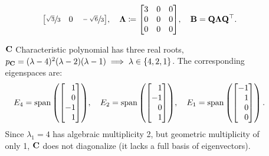 \documentclass[11pt]{article}
\begin{document}
\begin{enumerate}
\begin{enumerate}[align=left]
\[\begin{bmatrix*}[r]
                            \sfrac{\sqrt{3}}{3} & 0                    & \sfrac{-\sqrt{6}}{3} \\
                        \end{bmatrix*}
                        \!,
                        \quad
                        \mat{\Lambda} \coloneq
                        \begin{bmatrix}
                            3 & 0 & 0 \\
                            0 & 0 & 0 \\
                            0 & 0 & 0 \\
                        \end{bmatrix}
                        \!,
                        \quad
                        \mat{B} = \mat{Q} \mat{\Lambda} \mat{Q}^\top.
                    \]

              \item[$\mathbf{C}$] Characteristic polynomial has three real roots, $p_{\mathbf{C}} = (\lambda
                        - 4)^2(\lambda - 2)(\lambda - 1) \implies \lambda \in \left\{4, 2, 1\right\}$.  The
                    corresponding eigenspaces are:
                    \[
                        E_4 = \Span \args{
                            \begin{bmatrix*}[r]
                                1 \\ 0 \\ -1 \\ 1
                            \end{bmatrix*}
                        }
                        \! , \quad
                        E_2 = \Span \args{
                            \begin{bmatrix*}[r]
                                1 \\ -1 \\ 0 \\ 1
                            \end{bmatrix*}
                        }
                        \! , \quad
                        E_1 = \Span \args{
                            \begin{bmatrix*}[r]
                                -1 \\ 1 \\ 0 \\ 0
                            \end{bmatrix*}
                        }.
                    \]
                    Since $\lambda_1 = 4$ has algebraic multiplicity 2, but geometric multiplicity
                    of only 1, $\mathbf{C}$ does not diagonalize (it lacks a full basis of
                    eigenvectors).


\end{enumerate}
\end{enumerate}
\end{document}
